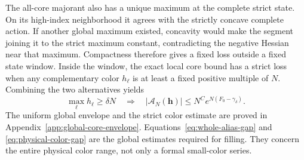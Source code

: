 The all-core majorant also has a unique maximum at the complete strict state. On its high-index neighborhood it agrees with the strictly concave complete action. If another global maximum existed, concavity would make the segment joining it to the strict maximum constant, contradicting the negative Hessian near that maximum. Compactness therefore gives a fixed loss outside a fixed state window. Inside the window, the exact local core bound has a strict loss when any complementary color $h_\ell$ is at least a fixed positive multiple of $N$. Combining the two alternatives yields
\begin{equation}\label{eq:physical-color-gap}
 \max_\ell h_\ell\ge\delta N
 \quad\Longrightarrow\quad
 |\mathcal A_N(\mathbf h)|\le N^C e^{N(F_0-\gamma_\delta)}.
\end{equation}
The uniform global envelope and the strict color estimate are proved in Appendix~\ref{app:global-core-envelope}. Equations~\eqref{eq:whole-alias-gap} and \eqref{eq:physical-color-gap} are the global estimates required for filling. They concern the entire physical color range, not only a formal small-color series.
